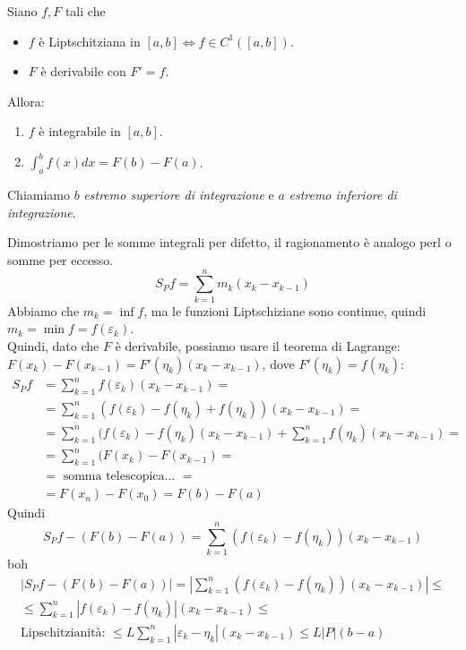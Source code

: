 \begin{teorema}
    Siano $f,F$ tali che
    \begin{itemize}
        \item $f$ è Liptschitziana in $[a,b] \iff f\in C^1([a,b])$.
        \item $F$ è derivabile con $F'=f$.
    \end{itemize}
    Allora:
    \begin{enumerate}
        \item $f$ è integrabile in $[a,b]$.
        \item $\int_{a}^{b}f(x)dx=F(b)-F(a)$.
    \end{enumerate}
    Chiamiamo $b$ \textit{estremo superiore di integrazione} e $a$ \textit{estremo inferiore di integrazione}.
\end{teorema}

\begin{dimostrazione}[]
    Dimostriamo per le somme integrali per difetto, il ragionamento è analogo perl o somme per eccesso.
    \begin{equation}
        S_Pf=\sum_{k=1}^{n}m_k(x_k-x_{k-1})
    \end{equation}
    Abbiamo che $m_k=\inf f$, ma le funzioni Liptschiziane sono continue, quindi $m_k=\min f=f(\varepsilon_k)$.\\
    Quindi, dato che $F$ è derivabile, possiamo usare il teorema di Lagrange: $F(x_k)-F(x_{k-1})=F'(\eta_k)(x_k-x_{k-1})$, dove $F'(\eta_k)=f(\eta_k)$:
    \begin{align*}
        S_Pf &=\sum_{k=1}^{n}f(\varepsilon_k)(x_k-x_{k-1})=\\
             &=\sum_{k=1}^{n}(f(\varepsilon_k)-f(\eta_k)+f(\eta_k))(x_k-x_{k-1})=\\
             &=\sum_{k=1}^{n}(f(\varepsilon_k)-f(\eta_k)(x_k-x_{k-1})+\sum_{k=1}^{n}f(\eta_k)(x_k-x_{k-1})= \\
             &=\sum_{k=1}^{n}(F(x_k)-F(x_{k-1})= \\
             &=\text{ somma telescopica... }= \\
             &=F(x_n)-F(x_0)=F(b)-F(a)
    \end{align*}
    Quindi
    \begin{equation}
        S_Pf-(F(b)-F(a))=\sum_{k=1}^{n}(f(\varepsilon_k)-f(\eta_k))(x_k-x_{k-1})
    \end{equation}
    boh
    \begin{gather}
        |S_Pf-(F(b)-F(a))|=|\sum_{k=1}^{n}(f(\varepsilon_k)-f(\eta_k))(x_k-x_{k-1})| \leq \\
        \leq \sum_{k=1}^{n}|f(\varepsilon_k)-f(\eta_k)|(x_k-x_{k-1}) \leq \\
        \text{Lipschitzianità: }\leq L \sum_{k=1}^{n}|\varepsilon_k-\eta_k|(x_k-x_{k-1})\leq L|P|(b-a)
    \end{gather}
\end{dimostrazione}

